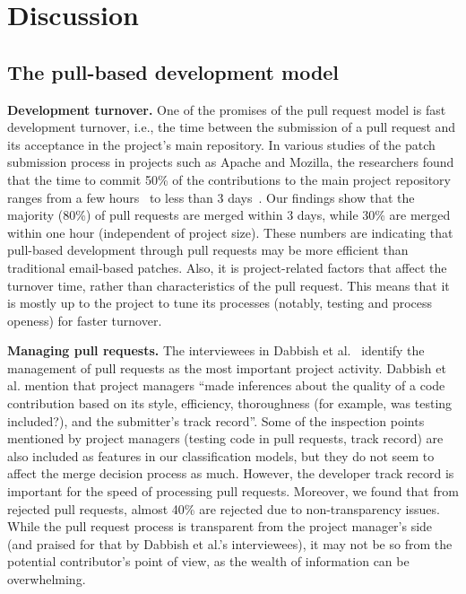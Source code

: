 \documentclass{sig-alternate}
\begin{document}
\section{Discussion}
\label{sec:discussion}

\subsection{The pull-based development model}

\textbf{Development turnover.} One of the promises of the pull request model is
fast development turnover, i.e., the time between the submission of a pull
request and its acceptance in the project's main repository. In various studies
of the patch submission process in projects such as Apache and Mozilla, the
researchers found that the time to commit 50\% of the contributions to the main
project repository ranges from a few hours~\cite{Rigby08} to less than 3
days~\cite{Weiss08, Baysa12}. Our findings show that the majority (80\%) of pull
requests are merged within 3 days, while 30\% are
merged within one hour (independent of project size). These numbers are
indicating that pull-based development through pull requests may be more
efficient than traditional email-based patches.  Also, it is project-related
factors that affect the turnover time, rather than characteristics of the pull
request. This means that it is mostly up to the project to tune its processes
(notably, testing and process openess) for faster turnover.

\textbf{Managing pull requests.} The interviewees in Dabbish et
al.~\cite{Dabbi13} identify the management of pull requests as the most
important project activity. Dabbish et al. mention that project managers ``made
inferences about the quality of a code contribution based on its style,
efficiency, thoroughness (for example, was testing included?), and the
submitter's track record''. Some of the inspection points mentioned by project
managers (testing code in
pull requests, track record) are also included as features in our classification
models, but they do not seem to affect the merge decision process as much.
However, the developer track record is important for the speed of processing
pull requests. Moreover, we found that from rejected pull requests, almost 40\%
are rejected due to non-transparency issues. While the pull request process is
transparent from the project manager's side (and praised for that by Dabbish et
al.'s interviewees), it may not be so from the potential contributor's point of
view, as the wealth of information can be overwhelming.
\end{document}

